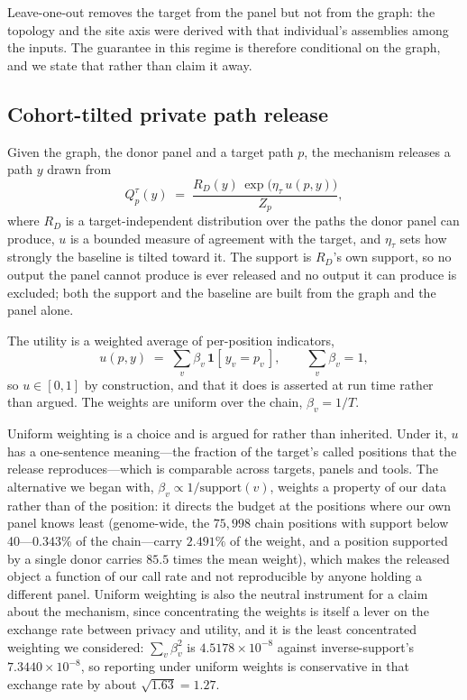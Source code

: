 Leave-one-out removes the target from the panel but not from the graph: the topology
and the site axis were derived with that individual's assemblies among the inputs.
The guarantee in this regime is therefore conditional on the graph, and we state that
rather than claim it away.

\subsection{Cohort-tilted private path release}

Given the graph, the donor panel and a target path $p$, the mechanism releases a path
$y$ drawn from
\begin{equation}
Q^{\tau}_{p}(y) \;=\; \frac{R_D(y)\,\exp\!\big(\eta_\tau\, u(p,y)\big)}{Z_p},
\end{equation}
where $R_D$ is a target-independent distribution over the paths the donor panel can
produce, $u$ is a bounded measure of agreement with the target, and $\eta_\tau$ sets
how strongly the baseline is tilted toward it. The support is $R_D$'s own support, so
no output the panel cannot produce is ever released and no output it can produce is
excluded; both the support and the baseline are built from the graph and the panel
alone.

The utility is a weighted average of per-position indicators,
\begin{equation}
u(p,y) \;=\; \sum_{v} \beta_v \,\mathbf{1}[\,y_v = p_v\,],
\qquad \sum_{v} \beta_v = 1,
\end{equation}
so $u \in [0,1]$ by construction, and that it does is asserted at run time rather
than argued. The weights are uniform over the chain, $\beta_v = 1/T$.

Uniform weighting is a choice and is argued for rather than inherited. Under it, $u$
has a one-sentence meaning---the fraction of the target's called positions that the
release reproduces---which is comparable across targets, panels and tools. The
alternative we began with, $\beta_v \propto 1/\mathrm{support}(v)$, weights a
property of our data rather than of the position: it directs the budget at the
positions where our own panel knows least (genome-wide, the $75{,}998$ chain
positions with support below 40---$0.343\%$ of the chain---carry $2.491\%$ of the
weight, and a position supported by a single donor carries $85.5$ times the mean
weight), which makes the released object a function of our call rate and not
reproducible by anyone holding a different panel. Uniform weighting is also the
neutral instrument for a claim about the mechanism, since concentrating the weights
is itself a lever on the exchange rate between privacy and utility, and it is the
least concentrated weighting we considered: $\sum_v \beta_v^2$ is
$4.5178\times10^{-8}$ against inverse-support's $7.3440\times10^{-8}$, so reporting
under uniform weights is conservative in that exchange rate by about
$\sqrt{1.63} = 1.27$.

